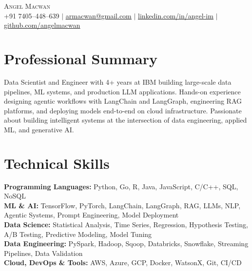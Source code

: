 \documentclass[a4paper,11pt]{article}
\newcommand{\sectionSpacing}{\vspace{1pt}}
\begin{document}
\begin{center}
    {\Huge\scshape Angel Macwan} \\ \vspace{1pt}
    \small +91 7405--448--639 $|$ \href{mailto:armacwan@gmail.com}{\underline{armacwan@gmail.com}} $|$
    \href{https://linkedin.com/in/angel-im}{\underline{linkedin.com/in/angel-im}} $|$
    \href{https://github.com/angelmacwan}{\underline{github.com/angelmacwan}}
\end{center}


\section{Professional Summary}
\begin{itemize}[leftmargin=0.15in, label={}]
  \small{\item{
    Data Scientist and Engineer with 4+ years at IBM building large-scale data pipelines, ML systems, and production LLM applications. Hands-on experience designing agentic workflows with LangChain and LangGraph, engineering RAG platforms, and deploying models end-to-end on cloud infrastructure. Passionate about building intelligent systems at the intersection of data engineering, applied ML, and generative AI.
  }}
\end{itemize}
\sectionSpacing

\section{Technical Skills}
 \begin{itemize}[leftmargin=0.15in, label={}]
    \small{\item{
    \textbf{Programming Languages:} Python, Go, R, Java, JavaScript, C/C++, SQL, NoSQL \\
    \textbf{ML \& AI:} TensorFlow, PyTorch, LangChain, LangGraph, RAG, LLMs, NLP, Agentic Systems, Prompt Engineering, Model Deployment \\
    \textbf{Data Science:} Statistical Analysis, Time Series, Regression, Hypothesis Testing, A/B Testing, Predictive Modeling, Model Tuning \\
    \textbf{Data Engineering:} PySpark, Hadoop, Sqoop, Databricks, Snowflake, Streaming Pipelines, Data Validation \\
    \textbf{Cloud, DevOps \& Tools:} AWS, Azure, GCP, Docker, WatsonX, Git, CI/CD
}}
 \end{itemize}
\sectionSpacing
\end{document}
